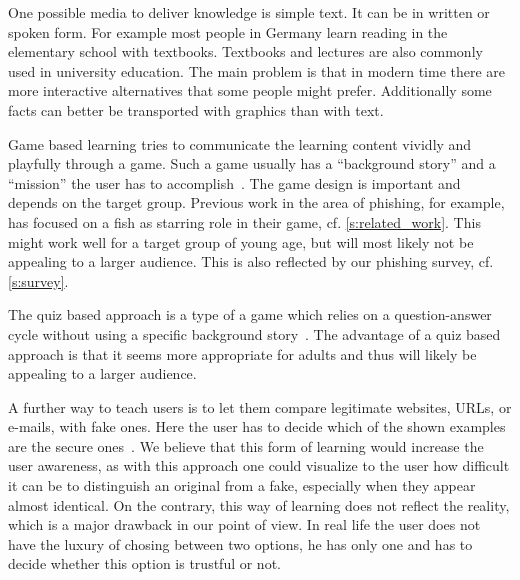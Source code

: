 \begin{description}[leftmargin=0cm]
    \item[Simple Text] One possible media to deliver knowledge is simple text. It can be in written or spoken form. For example most people in Germany learn reading in the elementary school with textbooks. Textbooks and lectures are also commonly used in university education.
    The main problem is that in modern time there are more interactive alternatives that some people might prefer.
    Additionally some facts can better be transported with graphics than with text.
    
	\item[Game Based Learning] Game based learning tries to communicate the learning content vividly and playfully through a game.
 Such a game usually has a ``background story'' and a ``mission'' the user has to accomplish~\cite{sheng2007antiphishingphil,antiphishingphyllis}. The game design is important and depends on the target group.
 Previous work in the area of phishing, for example, has focused on a fish as starring role in their game, cf. \autoref{s:related_work}. This might work well for a target group of young age, but will most likely not be appealing to a larger audience.
 This is also reflected by our phishing survey, cf. \autoref{s:survey}.
	\item[Quiz Based Learning] The quiz based approach is a type of a game which relies on a question-answer cycle without using a specific background story~\cite{onguardonline}. The advantage of a quiz based approach is that it seems more appropriate for adults and thus will likely be appealing to a larger audience.

	\item[Comparison Based Learning] A further way to teach users is to let them compare legitimate websites, URLs, or e-mails, with fake ones.
 Here the user has to decide which of the shown examples are the secure ones~\cite{staysafeonline}. 
We believe that this form of learning would increase the user awareness, as with this approach one could visualize to the user how difficult it can be to distinguish an original from a fake, especially when they appear almost identical.
 On the contrary, this way of learning does not reflect the reality, which is a major drawback in our point of view.
 In real life the user does not have the luxury of chosing between two options, he has only one and has to decide whether this option is trustful or not.


\end{description}
